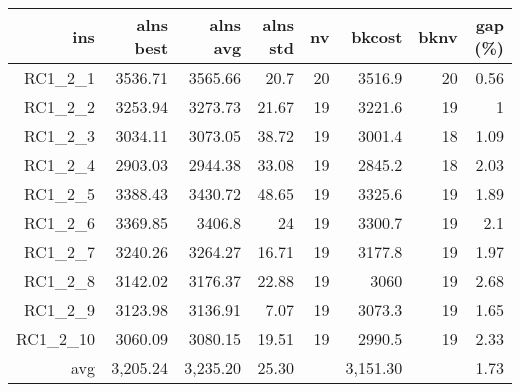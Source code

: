   \begin{table}[caption={Kết quả đo với tập HG\_RC\_1\_2 200 yêu cầu}, label=exp:HGRC12]
    \small
    \centering
    \begin{tabular}{rrrrrrrr}
    \hline
    ins & alns best & alns avg & alns std & nv & bkcost & bknv & gap (\%) \\ \hline
    RC1\_2\_1 & 3536.71 & 3565.66 & 20.7 & 20 & 3516.9 & 20 & 0.56 \\ \hline
    RC1\_2\_2 & 3253.94 & 3273.73 & 21.67 & 19 & 3221.6 & 19 & 1 \\ \hline
    RC1\_2\_3 & 3034.11 & 3073.05 & 38.72 & 19 & 3001.4 & 18 & 1.09 \\ \hline
    RC1\_2\_4 & 2903.03 & 2944.38 & 33.08 & 19 & 2845.2 & 18 & 2.03 \\ \hline
    RC1\_2\_5 & 3388.43 & 3430.72 & 48.65 & 19 & 3325.6 & 19 & 1.89 \\ \hline
    RC1\_2\_6 & 3369.85 & 3406.8 & 24 & 19 & 3300.7 & 19 & 2.1 \\ \hline
    RC1\_2\_7 & 3240.26 & 3264.27 & 16.71 & 19 & 3177.8 & 19 & 1.97 \\ \hline
    RC1\_2\_8 & 3142.02 & 3176.37 & 22.88 & 19 & 3060 & 19 & 2.68 \\ \hline
    RC1\_2\_9 & 3123.98 & 3136.91 & 7.07 & 19 & 3073.3 & 19 & 1.65 \\ \hline
    RC1\_2\_10 & 3060.09 & 3080.15 & 19.51 & 19 & 2990.5 & 19 & 2.33 \\ \hline
    avg & 3,205.24 & 3,235.20 & 25.30 & & 3,151.30 & & 1.73 \\ \hline
    \end{tabular}
  \end{table}

